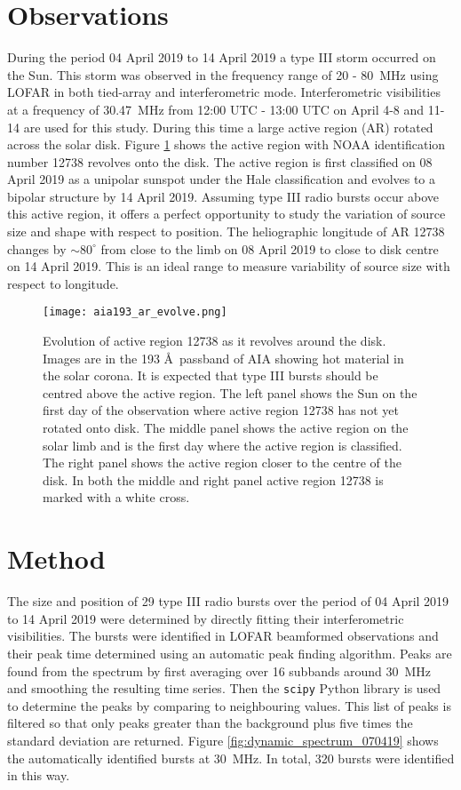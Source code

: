 \section{Observations}
\label{obsvtheory_observations}
During the period 04 April 2019 to 14 April 2019 a type III storm occurred on the Sun. This storm was observed in the frequency range of 20 - 80~MHz using LOFAR in both tied-array and interferometric mode. Interferometric visibilities at a frequency of 30.47~MHz from 12:00 UTC - 13:00 UTC on April 4-8 and 11-14 are used for this study. During this time a large active region (AR) rotated across the solar disk. Figure \ref{fig:ar_evolve} shows the active region with NOAA identification number 12738 revolves onto the disk. The active region is first classified on 08 April 2019 as a unipolar sunspot under the Hale classification and evolves to a bipolar structure by 14 April 2019. Assuming type III radio bursts occur above this active region, it offers a perfect opportunity to study the variation of source size and shape with respect to position. The heliographic longitude of AR 12738 changes by $\sim 80^\circ$ from close to the limb on 08 April 2019 to close to disk centre on 14 April 2019. This is an ideal range to measure variability of source size with respect to longitude.

\begin{figure}[ht]
\centering
\texttt{[image: aia193\_ar\_evolve.png]}
\caption[Evolution of active region 12738 as it revolves around the disk.]{Evolution of active region 12738 as it revolves around the disk. Images are in the 193 \AA \ passband of AIA showing hot material in the solar corona. It is expected that type III bursts should be centred above the active region. The left panel shows the Sun on the first day of the observation where active region 12738 has not yet rotated onto disk. The middle panel shows the active region on the solar limb and is the first day where the active region is classified. The right panel shows the active region closer to the centre of the disk. In both the middle and right panel active region 12738 is marked with a white cross.}
\label{fig:ar_evolve}
\end{figure}

\section{Method}
\label{sec:obsvtheory_method}
The size and position of 29 type III radio bursts over the period of 04 April 2019 to 14 April 2019 were determined by directly fitting their interferometric visibilities. The bursts were identified in LOFAR beamformed observations and their peak time determined using an automatic peak finding algorithm. Peaks are found from the spectrum by first averaging over 16 subbands around 30~MHz and smoothing the resulting time series. Then the \texttt{scipy} Python library \citep{Virtanen2020} is used to determine the peaks by comparing to neighbouring values. This list of peaks is filtered so that only peaks greater than the background plus five times the standard deviation are returned.
Figure \ref{fig:dynamic_spectrum_070419} shows the automatically identified bursts at 30~MHz. In total, 320 bursts were identified in this way. 

